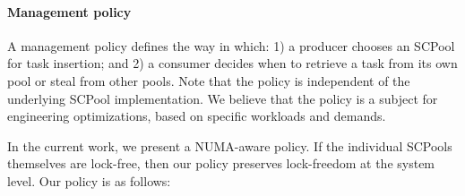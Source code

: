 

\paragraph {Management policy}
A management policy defines the way in which: 1) a producer chooses an SCPool for task insertion; and 2) a consumer decides when to retrieve a task from its own pool or steal from other pools. 
Note that the policy is independent of the underlying SCPool implementation. We believe that the policy is a subject for engineering optimizations, based on specific workloads and demands.

In the current work, we present a NUMA-aware policy. If the individual SCPools themselves are lock-free, then our policy preserves lock-freedom at the system level. Our policy is as follows:

